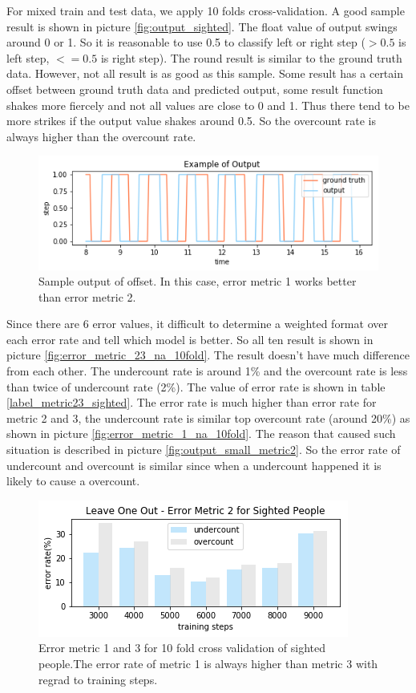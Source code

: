 \documentclass[11pt]{article}
\begin{document}
For mixed train and test data, we apply 10 folds cross-validation. A good sample result is shown in picture \ref{fig:output_sighted}. The float value of output swings around 0 or 1. So it is reasonable to use 0.5 to classify left or right step ($>0.5$ is left step, $<=0.5$ is right step). The round result is similar to the ground truth data. However, not all result is as good as this sample. Some result has a certain offset between ground truth data and predicted output, some result function shakes more fiercely and not all values are close to 0 and 1. Thus there tend to be more strikes if the output value shakes around 0.5. So the overcount rate is always higher than the overcount rate.

\begin{figure}[ht]
\centering
\includegraphics[scale=0.4]{output_ex_offset}
\caption{Sample output of offset. In this case, error metric 1 works better than error metric 2.}
\label{fig:output_ex_offset}
\end{figure}


Since there are 6 error values, it difficult to determine a weighted format over each error rate and tell which model is better. So all ten result is shown in picture \ref{fig:error_metric_23_na_10fold}. The result doesn't have much difference from each other. The undercount rate is around 1\% and the overcount rate is less than twice of undercount rate (2\%). The value of error rate is shown in table \ref{label_metric23_sighted}. The error rate is much higher than error rate for metric 2 and 3, the undercount rate is similar top overcount rate (around 20\%) as shown in picture \ref{fig:error_metric_1_na_10fold}. The reason that caused such situation is described in picture \ref{fig:output_small_metric2}. So the error rate of undercount and overcount is similar since when a undercount happened it is likely to cause a overcount.

\begin{figure}[ht]
\centering
\includegraphics[scale=0.55]{error_metric_2_na_step}
\caption{Error metric 1 and 3 for 10 fold cross validation of sighted people.The error rate of metric 1 is always higher than metric 3 with regrad to training steps.}
\label{fig:error_metric_2_na_step}
\end{figure}
\end{document}
